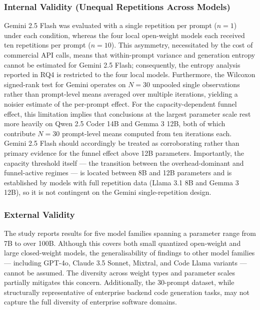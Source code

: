 \documentclass[review,12pt,3p]{elsarticle}
\begin{document}
\subsubsection{Internal Validity (Unequal Repetitions Across Models)}

Gemini 2.5 Flash was evaluated with a single repetition per prompt ($n = 1$) under each
condition, whereas the four local open-weight models each received ten repetitions per
prompt ($n = 10$). This asymmetry, necessitated by the cost of commercial API calls,
means that within-prompt variance and generation entropy cannot be estimated for
Gemini 2.5 Flash; consequently, the entropy analysis reported in RQ4 is restricted to
the four local models. Furthermore, the Wilcoxon signed-rank test for Gemini operates
on $N = 30$ unpooled single observations rather than prompt-level means averaged over
multiple iterations, yielding a noisier estimate of the per-prompt effect. For the
capacity-dependent funnel effect, this limitation implies that conclusions at the
largest parameter scale rest more heavily on Qwen 2.5 Coder 14B and Gemma 3 12B, both
of which contribute $N = 30$ prompt-level means computed from ten iterations each.
Gemini 2.5 Flash should accordingly be treated as corroborating rather than primary
evidence for the funnel effect above 12B parameters. Importantly, the capacity
threshold itself --- the transition between the overhead-dominant and funnel-active
regimes --- is located between 8B and 12B parameters and is established by models
with full repetition data (Llama 3.1 8B and Gemma 3 12B), so it is not contingent
on the Gemini single-repetition design.

\subsubsection{External Validity}

The study reports results for five model families spanning a parameter range from 7B to
over 100B. Although this covers both small quantized open-weight and large closed-weight
models, the generalisability of findings to other model families --- including GPT-4o,
Claude 3.5 Sonnet, Mixtral, and Code Llama variants --- cannot be assumed. The diversity
across weight types and parameter scales partially mitigates this concern. Additionally,
the 30-prompt dataset, while structurally representative of enterprise backend code
generation tasks, may not capture the full diversity of enterprise software domains.

\end{document}
